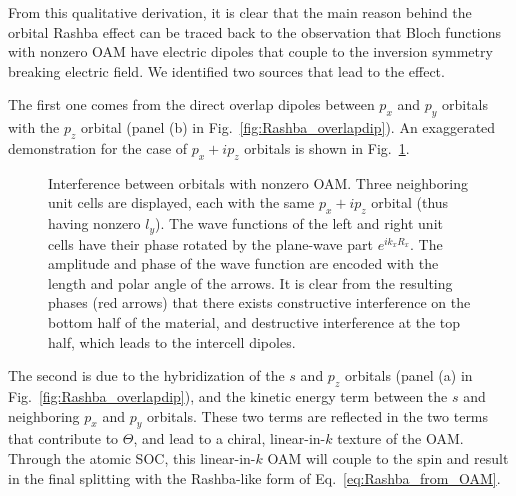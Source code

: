 From this qualitative derivation, it is clear that the main reason behind the orbital Rashba effect can be traced back to the observation that Bloch functions with nonzero OAM have electric dipoles that couple to the inversion symmetry breaking electric field.
We identified two sources that lead to the effect.

The first one comes from the direct overlap dipoles between $p_x$ and $p_y$ orbitals with the $p_z$ orbital (panel (b) in Fig.~\ref{fig:Rashba_overlapdip})\cite{Petersen2000}.
An exaggerated demonstration for the case of $p_x + ip_z$ orbitals is shown in Fig.~\ref{fig:Rashba_interference}.
\begin{figure}[t!]
\caption{\label{fig:Rashba_interference}Interference between orbitals with nonzero OAM. Three neighboring unit cells are displayed, each with the same $p_x + ip_z$ orbital (thus having nonzero $l_y$). The wave functions of the left and right unit cells have their phase rotated by the plane-wave part $e^{i k_x R_x}$. The amplitude and phase of the wave function are encoded with the length and polar angle of the arrows. It is clear from the resulting phases (red arrows) that there exists constructive interference on the bottom half of the material, and destructive interference at the top half, which leads to the intercell dipoles.}
\end{figure}

The second is due to the hybridization of the $s$ and $p_z$ orbitals (panel (a) in Fig.~\ref{fig:Rashba_overlapdip}), and the kinetic energy term between the $s$ and neighboring $p_x$ and $p_y$ orbitals\cite{Go2016}.
These two terms are reflected in the two terms that contribute to $\Theta$, and lead to a chiral, linear-in-$k$ texture of the OAM.
Through the atomic SOC, this linear-in-$k$ OAM will couple to the spin and result in the final splitting with the Rashba-like form of Eq.~\ref{eq:Rashba_from_OAM}.

